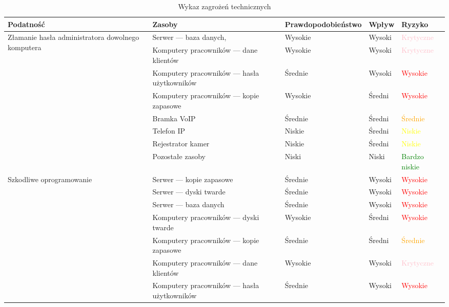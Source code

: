 \begin{landscape}
\begin{longtable}[!ht]{|m{4cm}|m{6cm}|m{4.5cm}|m{3cm}|m{3cm}|}
	\caption{Wykaz zagrożeń technicznych}
	\label{tab:zagrozenia_techniczne}\\
	\hline	
	\textbf{Podatność} & \textbf{Zasoby} & \textbf{Prawdopodobieństwo} & \textbf{Wpływ} &  \textbf{Ryzyko} \\ \hline
	\multirow{5}{4cm}{Złamanie hasła administratora dowolnego komputera}  
		&   Serwer --- baza danych,  & Wysokie & Wysoki & \textcolor{pink}{Krytyczne}  \\ \cline{2-5}
		& Komputery pracowników --- dane klientów & Wysokie & Wysoki & \textcolor{pink}{Krytyczne} \\ \cline{2-5}
		& Komputery pracowników --- hasła użytkowników & Średnie & Wysoki & \textcolor{red}{Wysokie} \\ \cline{2-5}
		& Komputery pracowników --- kopie zapasowe & Wysokie & Średni & \textcolor{red}{Wysokie} \\ \cline{2-5}
		& Bramka VoIP & Średnie & Średni & \textcolor{orange}{Średnie} \\ \cline{2-5}
		& Telefon IP & Niskie & Średni & \textcolor{yellow}{Niskie} \\ \cline{2-5}
		& Rejestrator kamer & Niskie & Średni & \textcolor{yellow}{Niskie} \\ \cline{2-5}
		& Pozostałe zasoby & Niski & Niski & \textcolor{green}{Bardzo niskie} \\ \cline{2-5}
	\hline
	\multirow{11}{4cm}{Szkodliwe oprogramowanie} 
		& Serwer --- kopie zapasowe & Średnie & Wysoki & \textcolor{red}{Wysokie} \\ \cline{2-5}
		& Serwer --- dyski twarde & Średnie & Wysoki & \textcolor{red}{Wysokie} \\ \cline{2-5}
		& Serwer --- baza danych & Średnie & Wysoki & \textcolor{red}{Wysokie} \\ \cline{2-5}
		& Komputery pracowników --- dyski twarde & Wysokie & Średni & \textcolor{red}{Wysokie} \\ \cline{2-5}
		& Komputery pracowników --- kopie zapasowe & Średnie & Średni & \textcolor{orange}{Średnie} \\ \cline{2-5}
		& Komputery pracowników --- dane klientów & Wysokie & Wysoki & \textcolor{pink}{Krytyczne} \\ \cline{2-5}
		& Komputery pracowników --- hasła użytkowników & Średnie & Wysoki & \textcolor{red}{Wysokie} \\ \cline{2-5}

\end{longtable}
\end{landscape}
